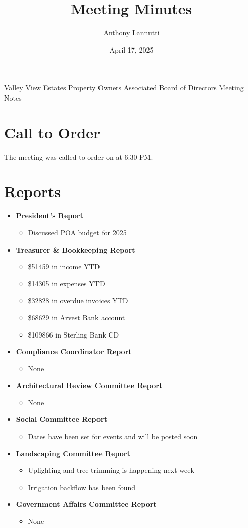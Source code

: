 \documentclass[12pt,a4paper]{article}
\author{Anthony Lannutti}
\date{April 17, 2025}
\title{Meeting Minutes}
\begin{document}
\begin{center}
  Valley View Estates Property Owners Associated Board of Directors Meeting Notes\break{}
  \@date{}
\end{center}

\section*{Call to Order}
\begin{flushleft}
The meeting was called to order on \@date{} at 6:30 PM\@.
\end{flushleft}


\section*{Reports}
\begin{itemize}
  \item \textbf{President's Report}
  \begin{itemize}
    \item Discussed POA budget for 2025
  \end{itemize}
  \item \textbf{Treasurer \& Bookkeeping Report}
  \begin{itemize}
    \item \$51459 in income YTD
    \item \$14305 in expenses YTD
    \item \$32828 in overdue invoices YTD
    \item \$68629 in Arvest Bank account
    \item \$109866 in Sterling Bank CD
  \end{itemize}
  \item \textbf{Compliance Coordinator Report}
  \begin{itemize}
    \item None
  \end{itemize}
  \item \textbf{Architectural Review Committee Report}
  \begin{itemize}
    \item None
  \end{itemize}
  \item \textbf{Social Committee Report}
  \begin{itemize}
    \item Dates have been set for events and will be posted soon
  \end{itemize}
  \item \textbf{Landscaping Committee Report}
  \begin{itemize}
    \item Uplighting and tree trimming is happening next week
    \item Irrigation backflow has been found
  \end{itemize}
  \item \textbf{Government Affairs Committee Report}
  \begin{itemize}
    \item None
  \end{itemize}
\end{itemize}
\end{document}
